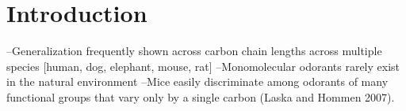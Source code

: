 \section{Introduction}

--Generalization frequently shown across carbon chain lengths across multiple species [human, dog, elephant, mouse, rat]
--Monomolecular odorants rarely exist in the natural environment
--Mice easily discriminate among odorants of many functional groups that vary only by a single carbon (Laska and Hommen 2007).
